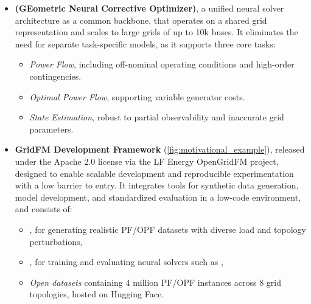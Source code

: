 \begin{itemize}
    \item \textbf{\genco (GEometric Neural Corrective Optimizer)}, a unified neural solver architecture as a common backbone, that operates on a shared grid representation and scales to large grids of up to 10k buses. It eliminates the need for separate task-specific models, as it supports three core tasks:

    \begin{itemize}
        \item \textit{Power Flow}, including off-nominal operating conditions and high-order contingencies.
        \item \textit{Optimal Power Flow}, supporting variable generator costs.
        \item \textit{State Estimation}, robust to partial observability and inaccurate grid parameters.
    \end{itemize}
    

    \item \textbf{GridFM Development Framework} (\cref{fig:motivational_example}), released under the Apache 2.0 license via the LF Energy \mbox{OpenGridFM} project, designed to enable scalable development and reproducible experimentation with a low barrier to entry. It integrates tools for synthetic data generation, model development, and standardized evaluation in a low-code environment, and consists of:
    \begin{itemize}
        \item \textit{\datakit}, for generating realistic PF/OPF datasets with diverse load and topology perturbations,
        \item \textit{\graphkit}, for training and evaluating neural solvers such as \genco,
        \item \textit{Open datasets} containing 4 million PF/OPF instances across 8 grid topologies, hosted on Hugging Face.
    \end{itemize}
\end{itemize}


